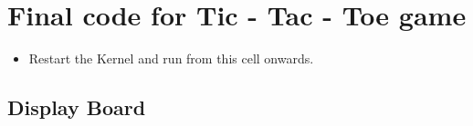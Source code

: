 \documentclass[11pt]{article}
\providecommand{\tightlist}{%
      \setlength{\itemsep}{0pt}\setlength{\parskip}{0pt}}
\begin{document}
    \hypertarget{final-code-for-tic---tac---toe-game}{%
\section{Final code for Tic - Tac - Toe
game}\label{final-code-for-tic---tac---toe-game}}

\begin{itemize}
\tightlist
\item
  Restart the Kernel and run from this cell onwards.
\end{itemize}

    \hypertarget{display-board}{%
\subsection{Display Board}\label{display-board}}
\end{document}
